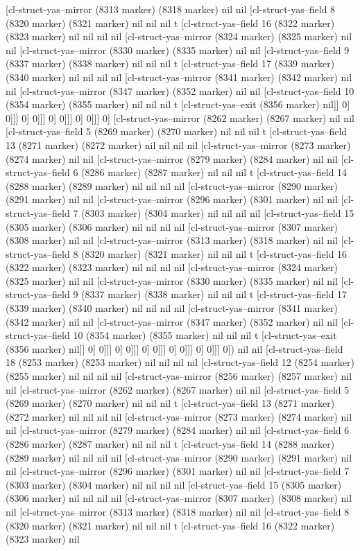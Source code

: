 {{[cl-struct-yas--mirror (8313 marker) (8318 marker) nil nil [cl-struct-yas--field 8 (8320 marker) (8321 marker) nil nil nil t [cl-struct-yas--field 16 (8322 marker) (8323 marker) nil nil nil nil [cl-struct-yas--mirror (8324 marker) (8325 marker) nil nil [cl-struct-yas--mirror (8330 marker) (8335 marker) nil nil [cl-struct-yas--field 9 (8337 marker) (8338 marker) nil nil nil t [cl-struct-yas--field 17 (8339 marker) (8340 marker) nil nil nil nil [cl-struct-yas--mirror (8341 marker) (8342 marker) nil nil [cl-struct-yas--mirror (8347 marker) (8352 marker) nil nil [cl-struct-yas--field 10 (8354 marker) (8355 marker) nil nil nil t [cl-struct-yas--exit (8356 marker) nil]] 0] 0]]] 0] 0]]] 0] 0]]] 0] 0]]] 0] [cl-struct-yas--mirror (8262 marker) (8267 marker) nil nil [cl-struct-yas--field 5 (8269 marker) (8270 marker) nil nil nil t [cl-struct-yas--field 13 (8271 marker) (8272 marker) nil nil nil nil [cl-struct-yas--mirror (8273 marker) (8274 marker) nil nil [cl-struct-yas--mirror (8279 marker) (8284 marker) nil nil [cl-struct-yas--field 6 (8286 marker) (8287 marker) nil nil nil t [cl-struct-yas--field 14 (8288 marker) (8289 marker) nil nil nil nil [cl-struct-yas--mirror (8290 marker) (8291 marker) nil nil [cl-struct-yas--mirror (8296 marker) (8301 marker) nil nil [cl-struct-yas--field 7 (8303 marker) (8304 marker) nil nil nil nil [cl-struct-yas--field 15 (8305 marker) (8306 marker) nil nil nil nil [cl-struct-yas--mirror (8307 marker) (8308 marker) nil nil [cl-struct-yas--mirror (8313 marker) (8318 marker) nil nil [cl-struct-yas--field 8 (8320 marker) (8321 marker) nil nil nil t [cl-struct-yas--field 16 (8322 marker) (8323 marker) nil nil nil nil [cl-struct-yas--mirror (8324 marker) (8325 marker) nil nil [cl-struct-yas--mirror (8330 marker) (8335 marker) nil nil [cl-struct-yas--field 9 (8337 marker) (8338 marker) nil nil nil t [cl-struct-yas--field 17 (8339 marker) (8340 marker) nil nil nil nil [cl-struct-yas--mirror (8341 marker) (8342 marker) nil nil [cl-struct-yas--mirror (8347 marker) (8352 marker) nil nil [cl-struct-yas--field 10 (8354 marker) (8355 marker) nil nil nil t [cl-struct-yas--exit (8356 marker) nil]] 0] 0]]] 0] 0]]] 0] 0]]] 0] 0]]] 0] 0]]] 0]) nil nil [cl-struct-yas--field 18 (8253 marker) (8253 marker) nil nil nil nil [cl-struct-yas--field 12 (8254 marker) (8255 marker) nil nil nil nil [cl-struct-yas--mirror (8256 marker) (8257 marker) nil nil [cl-struct-yas--mirror (8262 marker) (8267 marker) nil nil [cl-struct-yas--field 5 (8269 marker) (8270 marker) nil nil nil t [cl-struct-yas--field 13 (8271 marker) (8272 marker) nil nil nil nil [cl-struct-yas--mirror (8273 marker) (8274 marker) nil nil [cl-struct-yas--mirror (8279 marker) (8284 marker) nil nil [cl-struct-yas--field 6 (8286 marker) (8287 marker) nil nil nil t [cl-struct-yas--field 14 (8288 marker) (8289 marker) nil nil nil nil [cl-struct-yas--mirror (8290 marker) (8291 marker) nil nil [cl-struct-yas--mirror (8296 marker) (8301 marker) nil nil [cl-struct-yas--field 7 (8303 marker) (8304 marker) nil nil nil nil [cl-struct-yas--field 15 (8305 marker) (8306 marker) nil nil nil nil [cl-struct-yas--mirror (8307 marker) (8308 marker) nil nil [cl-struct-yas--mirror (8313 marker) (8318 marker) nil nil [cl-struct-yas--field 8 (8320 marker) (8321 marker) nil nil nil t [cl-struct-yas--field 16 (8322 marker) (8323 marker) nil }}
